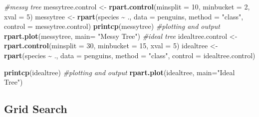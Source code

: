 \documentclass[12pt]{article}
\newenvironment{Shaded}{\begin{snugshade}}{\end{snugshade}}
\newcommand{\CommentTok}[1]{\textcolor[rgb]{0.56,0.35,0.01}{\textit{#1}}}
\newcommand{\DataTypeTok}[1]{\textcolor[rgb]{0.13,0.29,0.53}{#1}}
\newcommand{\DecValTok}[1]{\textcolor[rgb]{0.00,0.00,0.81}{#1}}
\newcommand{\KeywordTok}[1]{\textcolor[rgb]{0.13,0.29,0.53}{\textbf{#1}}}
\newcommand{\NormalTok}[1]{#1}
\newcommand{\OperatorTok}[1]{\textcolor[rgb]{0.81,0.36,0.00}{\textbf{#1}}}
\newcommand{\StringTok}[1]{\textcolor[rgb]{0.31,0.60,0.02}{#1}}
\begin{document}
\begin{Shaded}
\begin{Highlighting}[]
\CommentTok{\#messy tree}
\NormalTok{messytree.control <{-}}\StringTok{ }\KeywordTok{rpart.control}\NormalTok{(}\DataTypeTok{minsplit =} \DecValTok{10}\NormalTok{, }\DataTypeTok{minbucket =} \DecValTok{2}\NormalTok{, }
                                        \DataTypeTok{xval =} \DecValTok{5}\NormalTok{)}
\NormalTok{messytree <{-}}\StringTok{ }\KeywordTok{rpart}\NormalTok{(species }\OperatorTok{\textasciitilde{}}\StringTok{ }\NormalTok{., }\DataTypeTok{data =}\NormalTok{ penguins, }\DataTypeTok{method =} \StringTok{"class"}\NormalTok{, }
                        \DataTypeTok{control =}\NormalTok{ messytree.control)}
\KeywordTok{printcp}\NormalTok{(messytree)}
\CommentTok{\#plotting and output}
\KeywordTok{rpart.plot}\NormalTok{(messytree, }\DataTypeTok{main=} \StringTok{"Messy Tree"}\NormalTok{)}
\CommentTok{\#ideal tree}
\NormalTok{idealtree.control <{-}}\StringTok{ }\KeywordTok{rpart.control}\NormalTok{(}\DataTypeTok{minsplit =} \DecValTok{30}\NormalTok{, }\DataTypeTok{minbucket =} \DecValTok{15}\NormalTok{, }
                                   \DataTypeTok{xval =} \DecValTok{5}\NormalTok{)}
\NormalTok{idealtree <{-}}\StringTok{ }\KeywordTok{rpart}\NormalTok{(species }\OperatorTok{\textasciitilde{}}\StringTok{ }\NormalTok{., }\DataTypeTok{data =}\NormalTok{ penguins, }\DataTypeTok{method =} \StringTok{"class"}\NormalTok{, }
                   \DataTypeTok{control =}\NormalTok{ idealtree.control)}

\KeywordTok{printcp}\NormalTok{(idealtree)}
\CommentTok{\#plotting and output}
\KeywordTok{rpart.plot}\NormalTok{(idealtree, }\DataTypeTok{main=}\StringTok{"Ideal Tree"}\NormalTok{)}
\end{Highlighting}
\end{Shaded}

\hypertarget{grid-search}{%
\subsection{Grid Search}\label{grid-search}}
\end{document}
